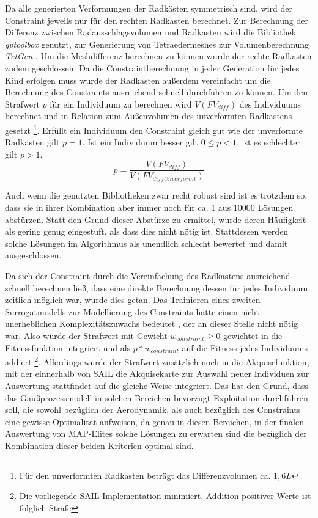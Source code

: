 Da alle generierten Verformungen der Radkästen symmetrisch sind, wird der Constraint jeweils nur für den rechten Radkasten berechnet.
Zur Berechnung der Differenz zwischen Radausschlagsvolumen und Radkasten wird die Bibliothek \textit{gptoolbox} \cite{gptoolbox.b} genutzt, zur Generierung von Tetraedermeshes zur Volumenberechnung \textit{TetGen} \cite{Si.2015}.
Um die Meshdifferenz berechnen zu können wurde der rechte Radkasten zudem geschlossen.
Da die Constraintberechnung in jeder Generation für jedes Kind erfolgen muss wurde der Radkasten außerdem vereinfacht um die Berechnung  des Constraints ausreichend schnell durchführen zu können.
Um den Strafwert $p$ für ein Individuum zu berechnen wird $V(FV_{diff})$ des Individuums berechnet und in Relation zum Außenvolumen des unverformten Radkastens gesetzt \footnote{Für den unverformten Radkasten beträgt das Differenzvolumen ca. $1,6L$}.
Erfüllt ein Individuum den Constraint gleich gut wie der unverformte Radkasten gilt $p=1$.
Ist ein Individuum besser gilt $0\leq p < 1$, ist es schlechter gilt $p>1$.
\[
	p = \frac{V(FV_{diff})}{V(FV_{diffUnverformt})}
\]

Auch wenn die genutzten Bibliotheken zwar recht robust sind ist es trotzdem so, dass sie in ihrer Kombination aber immer noch für ca. 1 aus 10000 Lösungen abstürzen.
Statt den Grund dieser Abstürze zu ermittel, wurde deren Häufigkeit als gering genug eingestuft, als dass dies nicht nötig ist.
Stattdessen werden solche Lösungen im Algorithmus als unendlich schlecht bewertet und damit ausgeschlossen.

Da sich der Constraint durch die Vereinfachung des Radkastens ausreichend schnell berechnen ließ, dass eine direkte Berechnung dessen für jedes Individuum zeitlich möglich war, wurde dies getan.
Das Trainieren eines zweiten Surrogatmodells zur Modellierung des Constraints hätte einen nicht unerheblichen Komplexitätszuwachs bedeutet , der an dieser Stelle nicht nötig war.
Also wurde der Strafwert mit Gewicht $w_{constraint} \geq 0$ gewichtet in die Fitnessfunktion integriert und als $p*w_{constraint}$ auf die Fitness jedes Individuums addiert
\footnote{Die vorliegende SAIL-Implementation minimiert, Addition positiver Werte ist folglich Strafe}.
Allerdings wurde der Strafwert zusätzlich noch in die Akquisefunktion, mit der einnerhalb von SAIL die Akquisekarte zur Auswahl neuer Individuen zur Auswertung stattfindet auf die gleiche Weise integriert. Das hat den Grund, dass das Gaußprozessmodell in solchen Bereichen bevorzugt Exploitation durchführen soll, die sowohl bezüglich der Aerodynamik, als auch bezüglich des Constraints eine gewisse Optimalität aufweisen, da genau in diesen Bereichen, in der finalen Auswertung von MAP-Elites solche Lösungen zu erwarten sind die bezüglich der Kombination dieser beiden Kriterien optimal sind.


